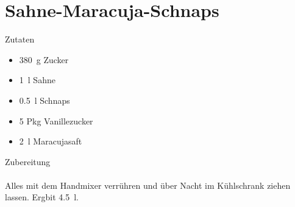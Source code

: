 \section*{Sahne-Maracuja-Schnaps}
\ihead{}\ohead{}
\cfoot{}
{\Large Zutaten}
\begin{multicols}{2}
\begin{itemize}
    \item \SI{380}{g} Zucker
    \item \SI{1}{l} Sahne
    \item \SI{0.5}{l} Schnaps
    \item \num{5} Pkg Vanillezucker
    \item \SI{2}{l} Maracujasaft
\end{itemize}
\end{multicols}
\noindent
{\Large Zubereitung}\\
\\
Alles mit dem Handmixer verrühren und über Nacht im Kühlschrank ziehen lassen.
Ergbit \SI{4.5}{l}.
